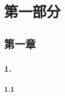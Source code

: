 \documentclass{ctexbook}
\title{}
\author{}
\date{}
\begin{document}
\part{第一部分}

\chapter{第一章}

\section{1. }

\subsection{1.1 }
\end{document}
